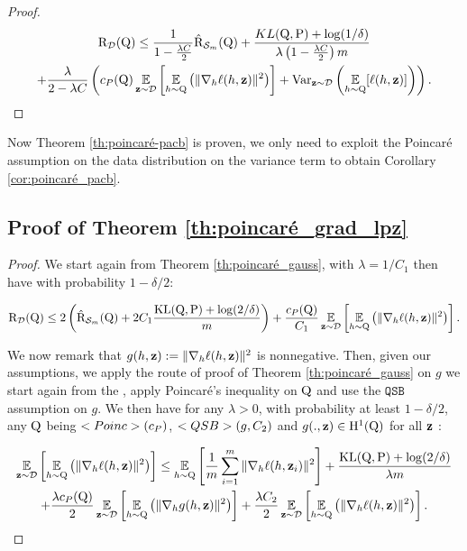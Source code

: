 \begin{noaddcontents}
\begin{proof}
        \begin{multline*}
          \text{R}_{\mathcal{D}}(\mathrm{Q}) \leq \frac{1}{1-\frac{\lambda C}{2}} \hat{\text{R}}_{\mathcal{S}_m}(\mathrm{Q}) + \frac{KL(\mathrm{Q},\mathrm{P}) +\log(1/\delta)}{\lambda \left( 1-\frac{\lambda C}{2}\right) m} \\
          + \frac{\lambda}{2-\lambda C}\left( c_{P}(\mathrm{Q})\operatorname*{\mathbb{E}}_{\mathbf{z}\sim\mathcal{D}} \left[ \operatorname*{\mathbb{E}}_{h\sim \mathrm{Q}}\left( \|\nabla_h \ell(h,\mathbf{z})\|^2 \right) \right]  + \mathrm{Var}_{\mathbf{z}\sim\mathcal{D}} \left( \operatorname*{\mathbb{E}}_{h\sim\mathrm{Q}}[\ell(h,\mathbf{z})] \right)  \right).
        \end{multline*}
    
      \end{proof}
    
      Now Theorem \ref{th:poincaré-pacb} is proven, we only need to exploit the Poincaré assumption on the data distribution on the variance term to obtain Corollary \ref{cor:poincaré_pacb}.
    
    \subsection{Proof of Theorem \ref{th:poincaré_grad_lpz}}
    \label{sec: proof_poincaré_grad}
    \begin{proof}
      We start again from Theorem \ref{th:poincaré_gauss}, with $\lambda= 1/C_1$ then have with probability $1-\delta/2$:
    
      \begin{multline}
        \label{eq: fast_rate_grad_lpz_1}
        \text{R}_{\mathcal{D}}(\mathrm{Q}) \leq 2 \left( \hat{\text{R}}_{\mathcal{S}_m}(\mathrm{Q}) + 2C_1\frac{\mathrm{KL}(\mathrm{Q},\mathrm{P}) +\log(2/\delta)}{ m} \right) + \frac{c_P(\mathrm{Q})}{C_1}\operatorname*{\mathbb{E}}_{\mathbf{z}\sim\mathcal{D}} \left[ \operatorname*{\mathbb{E}}_{h\sim \mathrm{Q}}\left( \|\nabla_h \ell(h,\mathbf{z})\|^2 \right) \right] .
      \end{multline}
    
      We now remark that $g(h,\mathbf{z}):= \|\nabla_h \ell(h,\mathbf{z})\|^2$ is nonnegative.
       Then, given our assumptions, we apply the route of proof of Theorem \ref{th:poincaré_gauss} on $g$ \ie we start again from the \citep[Corollary 17]{chugg2023unified}, apply Poincaré's inequality on $\mathrm{Q}$ and use the $\texttt{QSB}$ assumption on $g$. We then have for any $\lambda >0$, with probability at least $1-\delta/2$, any $\mathrm{Q}$ being $<Poinc>(c_P)$, $<QSB>\left( g,C_2\right)$ and $g(.,\mathbf{z})\in \mathrm{H}^{1}(\mathrm{Q})$ for all $\mathbf{z}$ :
    
       \begin{multline}
        \label{eq: fast_rate_grad_lpz_2}
        \operatorname*{\mathbb{E}}_{\mathbf{z}\sim\mathcal{D}} \left[ \operatorname*{\mathbb{E}}_{h\sim \mathrm{Q}}\left( \|\nabla_h \ell(h,\mathbf{z})\|^2 \right) \right] \leq \operatorname*{\mathbb{E}}_{h\sim \mathrm{Q}}\left[ \frac{1}{m}\sum_{i=1}^m \|\nabla_h\ell(h,\mathbf{z}_i)\|^2 \right]  + \frac{\mathrm{KL}(\mathrm{Q},\mathrm{P}) +\log(2/\delta)}{\lambda m} \\
        + \frac{\lambda c_P(\mathrm{Q})}{2}\operatorname*{\mathbb{E}}_{\mathbf{z}\sim\mathcal{D}} \left[ \operatorname*{\mathbb{E}}_{h\sim \mathrm{Q}}\left( \|\nabla_h g(h,\mathbf{z})\|^2 \right) \right] + \frac{\lambda C_2}{2}  \operatorname*{\mathbb{E}}_{\mathbf{z}\sim\mathcal{D}} \left[ \operatorname*{\mathbb{E}}_{h\sim \mathrm{Q}}\left( \|\nabla_h \ell(h,\mathbf{z})\|^2 \right) \right].
      \end{multline}
    

\end{proof}
\end{noaddcontents}
